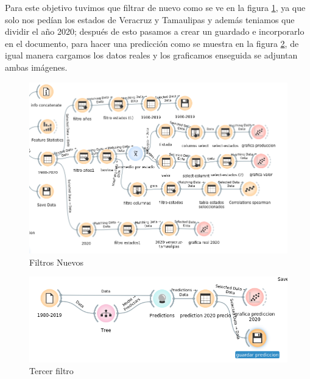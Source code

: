 \item Para este objetivo tuvimos que filtrar de nuevo como se ve en la figura \ref{filtrosnuevos}, ya que solo nos pedían los estados de Veracruz y Tamaulipas y además teniamos que dividir el año 2020; después de esto pasamos a crear un guardado e incorporarlo en el documento, para hacer una predicción como se muestra en la figura \ref{tercerfiltro}, de igual manera cargamos los datos reales y los graficamos enseguida se adjuntan ambas imágenes.
\begin{figure}[h]
    \centering
    \includegraphics[scale = 0.4]{imagenes/Orange2.png}
    \caption{Filtros Nuevos}
    \label{filtrosnuevos}
\end{figure}
\begin{figure}[h]
    \centering
    \includegraphics[scale = 0.5]{imagenes/orange3.png}
    \caption{Tercer filtro}
    \label{tercerfiltro}
\end{figure}
